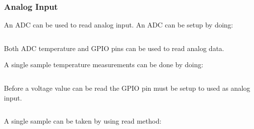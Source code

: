 \documentclass{beamer}
\begin{document}
\begin{frame}[allowframebreaks]
  \frametitle{Analog Input}
  An ADC can be used to read analog input. An ADC can be setup by doing:
  \begin{columns}[t]
    \begin{column}{.5\linewidth}
      
    \end{column}
    \begin{column}{.5\linewidth}
      
    \end{column}
  \end{columns}

  Both ADC temperature and GPIO pins can be used to read analog data.

  \pagebreak
  A single sample temperature measurements can be done by doing:
  \begin{columns}[t]
    \begin{column}{.5\linewidth}
      
    \end{column}
    \begin{column}{.5\linewidth}
      
    \end{column}
  \end{columns}

  \pagebreak

  Before a voltage value can be read the GPIO pin must be setup to used as analog input.
  \begin{columns}[t]
    \begin{column}{.5\linewidth}
      
    \end{column}
    \begin{column}{.5\linewidth}
      
    \end{column}
  \end{columns}

  A single sample can be taken by using read method:
  
\end{frame}
\end{document}
